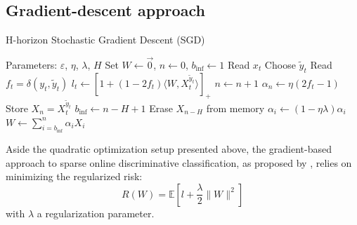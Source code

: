 \documentclass[preprint,12pt,authoryear]{elsarticle}
\begin{document}

\subsection{Gradient-descent approach}


\begin{algorithm}[t!]
	\caption{H-horizon Stochastic Gradient Descent (SGD)}\label{algo:HGD}
	\begin{algorithmic}
		
		\STATE Parameters:  $\varepsilon$, $\eta$, $\lambda$, $H$
		\STATE Set $W \leftarrow \vec{0}$, $n \leftarrow 0$, $b_\text{inf}\leftarrow 1$
		\STATE Read $x_t$
		\STATE Choose $\tilde{y}_t$		\STATE Read $f_t = \delta(y_t,\tilde{y}_t)$
		\STATE $l_t \leftarrow \left[ 1+(1-2f_t)\langle W,X_t^{\tilde{y}_t}\rangle\right]_{+}$ 
		\STATE $n \leftarrow n + 1$
		\STATE $\alpha_{n} \leftarrow \eta (2 f_t-1)$
		\STATE Store $X_{n} = X_t^{\tilde{y}_t}$
		\STATE $b_\text{inf} \leftarrow n - H + 1$
		\STATE Erase $X_{n - H }$ from memory
		\ENDIF 
		\STATE $\alpha_i \leftarrow (1 - \eta\lambda) \alpha_i$
		\ENDFOR			
		\STATE $W \leftarrow \sum_{i=b_\text{inf}}^n \alpha_i X_{i}$
		\ENDIF
		\ENDFOR
	\end{algorithmic}
\end{algorithm}

Aside the quadratic optimization setup presented above, the gradient-based approach to sparse online discriminative classification, as proposed by \cite{kivinen2004online}, relies on minimizing the regularized risk:
$$R(W) = \mathbb{E}\left[ l + \frac{\lambda}{2}\|W\|^2\right]$$
with $\lambda$ a regularization parameter.
\end{document}
